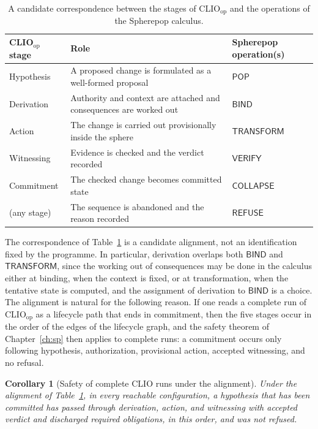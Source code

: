 \documentclass[11pt,twoside,openright]{book}
\theoremstyle{plain}
\newtheorem{corollary}[theorem]{Corollary}
\theoremstyle{definition}
\theoremstyle{remark}
\newcommand{\pop}{\mathsf{POP}}
\newcommand{\refuse}{\mathsf{REFUSE}}
\newcommand{\bind}{\mathsf{BIND}}
\newcommand{\transform}{\mathsf{TRANSFORM}}
\newcommand{\verify}{\mathsf{VERIFY}}
\newcommand{\collapse}{\mathsf{COLLAPSE}}
\begin{document}
\begin{table}[ht]
\centering
\caption{A candidate correspondence between the stages of CLIO$_{\mathrm{op}}$ and the operations of the Spherepop calculus.}
\label{tab:clio}
\begin{tabularx}{\textwidth}{@{}lXl@{}}
\toprule
CLIO$_{\mathrm{op}}$ stage & Role & Spherepop operation(s)\\
\midrule
Hypothesis & A proposed change is formulated as a well-formed proposal & $\pop$\\
Derivation & Authority and context are attached and consequences are worked out & $\bind$\\
Action & The change is carried out provisionally inside the sphere & $\transform$\\
Witnessing & Evidence is checked and the verdict recorded & $\verify$\\
Commitment & The checked change becomes committed state & $\collapse$\\
\midrule
(any stage) & The sequence is abandoned and the reason recorded & $\refuse$\\
\bottomrule
\end{tabularx}
\end{table}

The correspondence of Table~\ref{tab:clio} is a candidate alignment, not an identification fixed by the programme. In particular, derivation overlaps both $\bind$ and $\transform$, since the working out of consequences may be done in the calculus either at binding, when the context is fixed, or at transformation, when the tentative state is computed, and the assignment of derivation to $\bind$ is a choice. The alignment is natural for the following reason. If one reads a complete run of CLIO$_{\mathrm{op}}$ as a lifecycle path that ends in commitment, then the five stages occur in the order of the edges of the lifecycle graph, and the safety theorem of Chapter~\ref{ch:sp} then applies to complete runs: a commitment occurs only following hypothesis, authorization, provisional action, accepted witnessing, and no refusal.

\begin{corollary}[Safety of complete CLIO runs under the alignment]
Under the alignment of Table~\ref{tab:clio}, in every reachable configuration, a hypothesis that has been committed has passed through derivation, action, and witnessing with accepted verdict and discharged required obligations, in this order, and was not refused.
\end{corollary}
\end{document}
